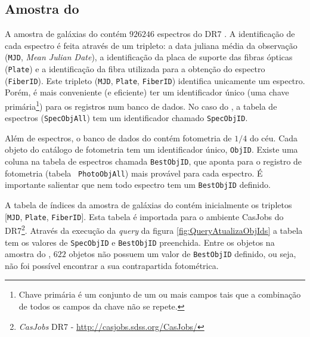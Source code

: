 \subsection{Amostra do \STARLIGHT}
\label{sec:Crossmatch:AmostraStarlight}

A amostra de galáxias do \starlight contém $926246$ espectros do \SDSS DR7
\citep{Abazajian2009}. A identificação de cada espectro é feita através de um
tripleto: a data juliana média da observação (\texttt{MJD}, {\em Mean Julian
Date}), a identificação da placa de suporte das fibras ópticas (\texttt{Plate})
e a identificação da fibra utilizada para a obtenção do espectro
(\texttt{FiberID}). Este tripleto (\texttt{MJD}, \texttt{Plate},
\texttt{FiberID}) identifica unicamente um espectro. Porém, é mais conveniente
(e eficiente) ter um identificador único (uma chave primária\footnote{Chave
primária é um conjunto de um ou mais campos tais que a combinação de todos os
campos da chave não se repete.}) para os registros num banco de dados. No caso
do \SDSS, a tabela de espectros (\texttt{SpecObjAll}) tem um identificador
chamado \texttt{SpecObjID}.

Além de espectros, o banco de dados do \SDSS contém fotometria de $1/4$ do céu.
Cada objeto do catálogo de fotometria tem um identificador único,
\texttt{ObjID}. Existe uma coluna na tabela de espectros chamada
\texttt{BestObjID}, que aponta para o registro de fotometria (tabela {\tt
PhotoObjAll}) mais provável para cada espectro. É importante salientar que nem
todo espectro tem um \texttt{BestObjID} definido.

A tabela de índices da amostra de galáxias do \starlight contém inicialmente os
tripletos [\texttt{MJD}, \texttt{Plate}, \texttt{FiberID}]. Esta tabela é
importada para o ambiente {CasJobs} do \SDSS DR7\footnote{{\em CasJobs} \SDSS
DR7 - \url{http://casjobs.sdss.org/CasJobs/}}. Através da execução da {\em
query} da figura \ref{fig:QueryAtualizaObjIds} a tabela tem os valores de
\texttt{SpecObjID} e \texttt{BestObjID} preenchida. Entre os objetos na amostra
do \starlight, $622$ objetos não possuem um valor de \texttt{BestObjID}
definido, ou seja, não foi possível encontrar a sua contrapartida fotométrica.



